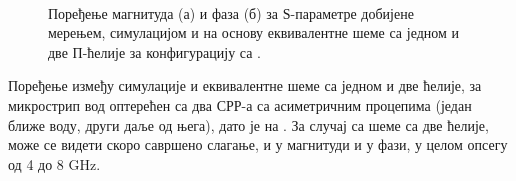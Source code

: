 \begin{figure}[!t]
\centering
{}\\
\caption{Поређење магнитуда (а) и фаза (б) за $Ѕ$-параметре добијене мерењем, симулацијом и на основу еквивалентне шеме са једном и две П-ћелије за конфигурацију са .} 
\label{f13}
\end{figure}
Поређење између симулације и еквивалентне шеме са једном и две ћелије, за микрострип вод оптерећен са два СРР-а са асиметричним процепима (један ближе воду, други даље од њега), дато је на . За случај са шеме са две ћелије, може се видети скоро савршено слагање, и у магнитуди и у фази, у целом опсегу од 4 до 8 GHz. 

